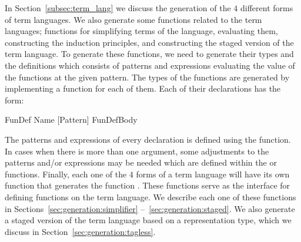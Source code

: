 In Section~\ref{subsec:term_lang} we discuss the generation of the $4$ different forms of term languages. We also generate some functions related to the term languages;  functions for simplifying terms of the language, evaluating them, constructing the induction principles, and constructing the staged version of the term language. 
To generate these functions, we need to generate their types and the definitions which consists of patterns and expressions evaluating the value of the functions at the given pattern. The types of the functions are generated by implementing a  function for each of them. Each of their declarations has the form: 
\begin{hscode}
FunDef Name [Pattern] FunDefBody
\end{hscode}
\noindent The patterns and expressions of every declaration is defined using the  function. In cases when there is more than one argument, some adjustments to the patterns and/or expressions may be needed which are defined within the  or  functions. Finally, each one of the $4$ forms of a term language will have its own  function that generates the function . These functions serve as the interface for defining functions on the term language. We describe each one of these functions in Sections~\ref{sec:generation:simplifier} --~\ref{sec:generation:staged}. 
We also generate a staged version of the term language based on a representation type, which we discuss in Section~\ref{sec:generation:tagless}.  

